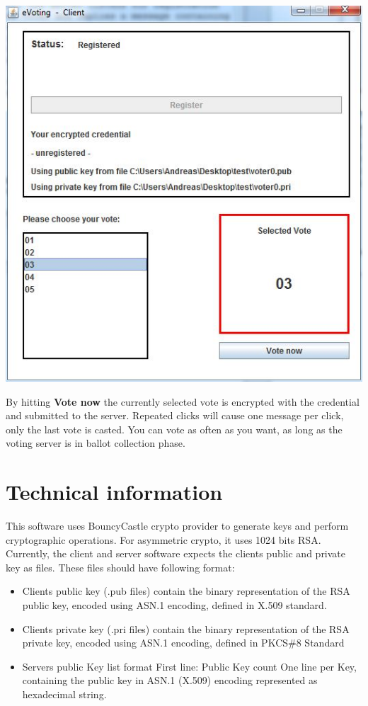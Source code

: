 \documentclass{article}
\begin{document}
\begin{center}
\includegraphics{./clientregistered.jpg}
\end{center}
By hitting \textbf{Vote now} the currently selected vote is encrypted with the credential and submitted to the server. Repeated clicks will cause one message per click, only the last vote is casted. You can vote as often as you want, as long as  the voting server is in ballot collection phase.

\section{Technical information}
This software uses BouncyCastle crypto provider to generate keys and perform cryptographic operations. For asymmetric crypto, it uses 1024 bits RSA. Currently, the client and server software expects the clients public and private key as files. 
These files should have following format:
\begin{itemize}
	\item Clients public key (.pub files) contain the binary representation of the RSA public key, encoded using ASN.1 encoding, defined in X.509 standard.
	\item Clients private key (.pri files) contain the binary representation of the RSA private key, encoded using ASN.1 encoding, defined in PKCS\#8 Standard
	\item Servers public Key list format
		\subitem First line: Public Key count
		\subitem One line per Key, containing the public key in ASN.1 (X.509) encoding represented as hexadecimal string.
\end{itemize}



\end{document}
